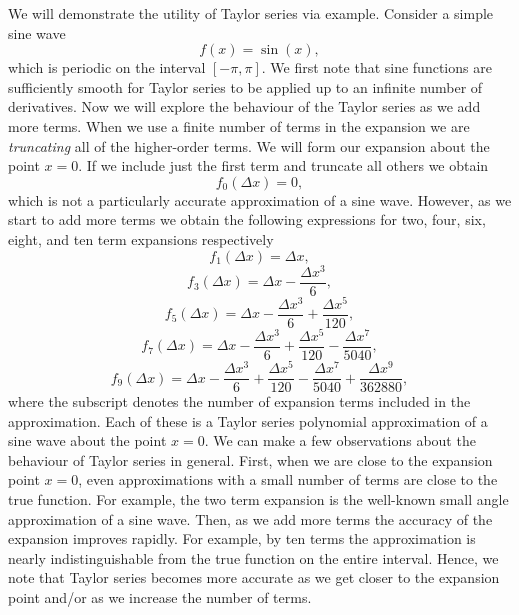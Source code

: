 We will demonstrate the utility of Taylor series via example. Consider a simple sine wave 
\begin{equation}
	f(x) = \sin(x),
\end{equation}
which is periodic on the interval $[- \pi, \pi]$. We first note that sine functions are sufficiently smooth for Taylor series to be applied up to an infinite number of derivatives. Now we will explore the behaviour of the Taylor series as we add more terms. When we use a finite number of terms in the expansion we are {\it truncating} all of the higher-order terms. We will form our expansion about the point $x = 0$. If we include just the first term and truncate all others we obtain
\begin{equation}
	f_0(\Delta x) = 0,
\end{equation}
which is not a particularly accurate approximation of a sine wave. However, as we start to add more terms we obtain the following expressions for two, four, six, eight, and ten term expansions respectively
\begin{equation}
	f_1(\Delta x) = \Delta x,
\end{equation}
\begin{equation}
	f_3(\Delta x) = \Delta x - \frac{\Delta x^3}{6},
\end{equation}
\begin{equation}
	f_5(\Delta x) = \Delta x - \frac{\Delta x^3}{6} + \frac{\Delta x^5}{120},
\end{equation}
\begin{equation}
	f_7(\Delta x) = \Delta x - \frac{\Delta x^3}{6} + \frac{\Delta x^5}{120} - \frac{\Delta x^7}{5040},
\end{equation}
\begin{equation}
	f_{9}(\Delta x) = \Delta x - \frac{\Delta x^3}{6} + \frac{\Delta x^5}{120} - \frac{\Delta x^7}{5040} + \frac{\Delta x^9}{362880},
\end{equation}
where the subscript denotes the number of expansion terms included in the approximation. Each of these is a Taylor series polynomial approximation of a sine wave about the point $x=0$. We can make a few observations about the behaviour of Taylor series in general. First, when we are close to the expansion point $x=0$, even approximations with a small number of terms are close to the true function. For example, the two term expansion is the well-known small angle approximation of a sine wave. Then, as we add more terms the accuracy of the expansion improves rapidly. For example, by ten terms the approximation is nearly indistinguishable from the true function on the entire interval. Hence, we note that Taylor series becomes more accurate as we get closer to the expansion point and/or as we increase the number of terms.

